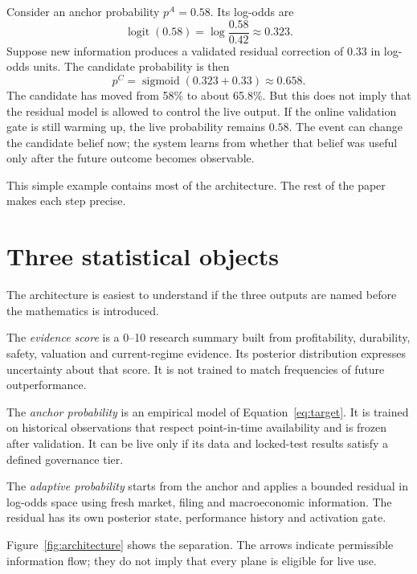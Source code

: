 \documentclass[11pt]{article}
\newcommand{\sigmoid}{\operatorname{sigmoid}}
\newcommand{\logit}{\operatorname{logit}}
\begin{document}
Consider an anchor probability $p^A=0.58$. Its log-odds are
\begin{equation}
\logit(0.58)=\log\frac{0.58}{0.42}\approx0.323.
\end{equation}
Suppose new information produces a validated residual correction of $0.33$ in log-odds units. The candidate probability is then
\begin{equation}
p^C=\sigmoid(0.323+0.33)\approx0.658.
\end{equation}
The candidate has moved from 58\% to about 65.8\%. But this does not imply that the residual model is allowed to control the live output. If the online validation gate is still warming up, the live probability remains $0.58$. The event can change the candidate belief now; the system learns from whether that belief was useful only after the future outcome becomes observable.

This simple example contains most of the architecture. The rest of the paper makes each step precise.

\section{Three statistical objects}
\label{sec:three}

The architecture is easiest to understand if the three outputs are named before the mathematics is introduced.

The \emph{evidence score} is a 0--10 research summary built from profitability, durability, safety, valuation and current-regime evidence. Its posterior distribution expresses uncertainty about that score. It is not trained to match frequencies of future outperformance.

The \emph{anchor probability} is an empirical model of Equation~\eqref{eq:target}. It is trained on historical observations that respect point-in-time availability and is frozen after validation. It can be live only if its data and locked-test results satisfy a defined governance tier.

The \emph{adaptive probability} starts from the anchor and applies a bounded residual in log-odds space using fresh market, filing and macroeconomic information. The residual has its own posterior state, performance history and activation gate.

Figure~\ref{fig:architecture} shows the separation. The arrows indicate permissible information flow; they do not imply that every plane is eligible for live use.
\end{document}
